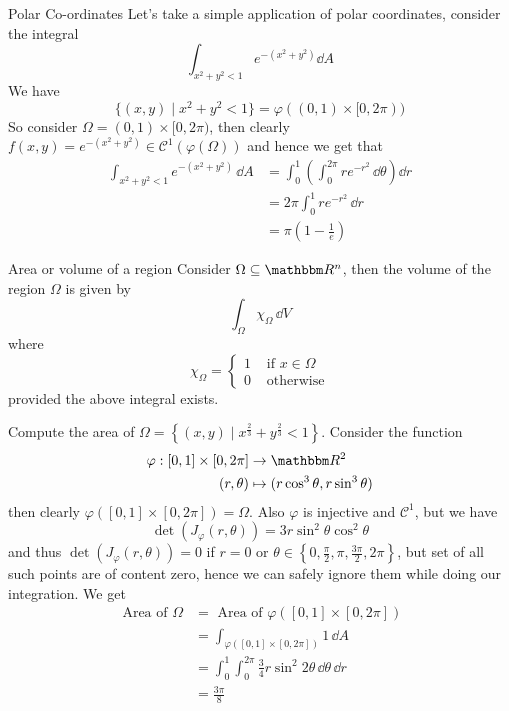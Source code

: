 \documentclass[Analysis-3]{subfiles}
\begin{document}
\begin{Eg}{Polar Co-ordinates}{}
    Let's take a simple application of polar coordinates, consider the integral 
    \[
        \int_{x^2 + y^2 < 1} e^{-(x^2+y^2)} \dd A     
    \]
    We have 
    \[
        \{ (x,y) \mid x^2 + y^2 < 1 \} = \varphi( (0,1) \times [0,2\pi))    
    \]
    So consider $\Omega = (0,1) \times [0,2\pi)$, then clearly $f(x,y) = e^{-(x^2+y^2)} \in \mathscr{C}^1(\varphi(\Omega))$ and hence we get that 
    \begin{align*}
        \int_{x^2+y^2 < 1} e^{-(x^2+y^2)} \, \dd A &= \int_0^1 \left( \int_0^{2\pi} re^{-r^2} \, \dd \theta \right) \dd r \\ 
        &= 2\pi \int_0^1 r e^{-r^2} \, \dd r \\ 
        &= \pi \left( 1 - \frac{1}{e}\right) 
    \end{align*} 
\end{Eg}

\begin{Def}{Area or volume of a region}{}
    Consider $\Omega \subseteq \R^n$, then the volume of the region $\Omega$ is given by 
    \[
        \int_{\Omega} \chi_{\Omega} \, \dd V    
    \]
    where
    \[
        \chi_{\Omega} = \begin{cases}
            1 & \mbox{ if } x \in \Omega \\ 
            0 & \mbox{ otherwise}
        \end{cases}  
    \]
    provided the above integral exists.
\end{Def}

\begin{Eg}{}{}
    Compute the area of $\Omega = \left\{ (x,y) \mid x^{\frac{2}{3}} + y^{\frac{2}{3}} < 1 \right\}$. Consider the function 
    \begin{align*}
        \varphi : [0,1] \times [0,2\pi] &\to \R^2 \\  
                (r,\theta) &\mapsto ( r\cos^3\theta, r\sin^3\theta )  
    \end{align*}
    then clearly $\varphi([0,1] \times [0,2\pi]) = \Omega$. Also $\varphi$ is injective and $\mathscr{C}^1$, but we have 
    \[
        \det(J_{\varphi}(r,\theta)) = 3r \sin^2\theta \cos^2\theta    
    \] 
    and thus $\det(J_{\varphi}(r,\theta)) = 0$ if $r = 0$ or $\theta \in \left\{ 0, \frac{\pi}{2}, \pi, \frac{3\pi}{2}, 2\pi \right\}$, but set of all such points are of content zero, hence we can safely ignore them while doing our integration. We get 
    \begin{align*}
        \mbox{ Area of } \Omega &= \mbox{ Area of } \varphi \left( [0,1] \times [0,2\pi] \right) \\ 
        &= \int_{\varphi([0,1] \times [0,2\pi])} 1 \, \dd A \\ 
        &= \int_0^1 \int_0^{2\pi} \frac{3}{4} r \sin^2 2\theta \, \dd \theta \, \dd r \\ 
        &= \frac{3\pi}{8}
    \end{align*}
\end{Eg}
\end{document}
